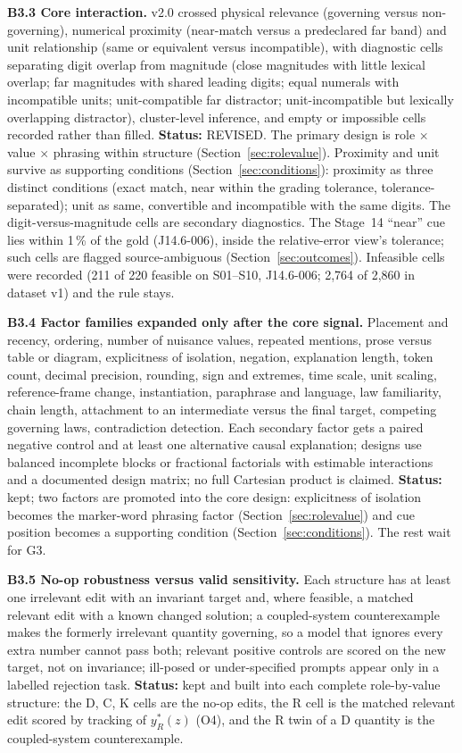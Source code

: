 \documentclass[10pt,a4paper]{article}
\begin{document}
\textbf{B3.3 Core interaction.} v2.0 crossed physical relevance (governing versus non-governing), numerical
proximity (near-match versus a predeclared far band) and unit relationship (same or equivalent versus
incompatible), with diagnostic cells separating digit overlap from magnitude (close magnitudes with little lexical
overlap; far magnitudes with shared leading digits; equal numerals with incompatible units; unit-compatible far
distractor; unit-incompatible but lexically overlapping distractor), cluster-level inference, and empty or
impossible cells recorded rather than filled. \textbf{Status:} REVISED. The primary design is role $\times$ value
$\times$ phrasing within structure (Section~\ref{sec:rolevalue}). Proximity and unit survive as supporting
conditions (Section~\ref{sec:conditions}): proximity as three distinct conditions (exact match, near within the
grading tolerance, tolerance-separated); unit as same, convertible and incompatible with the same digits. The
digit-versus-magnitude cells are secondary diagnostics. The Stage~14 ``near'' cue lies within 1\,\% of the gold
(J14.6-006), inside the relative-error view's tolerance; such cells are flagged source-ambiguous
(Section~\ref{sec:outcomes}). Infeasible cells were recorded (211 of 220 feasible on S01--S10, J14.6-006; 2,764
of 2,860 in dataset v1) and the rule stays.

\textbf{B3.4 Factor families expanded only after the core signal.} Placement and recency, ordering, number of
nuisance values, repeated mentions, prose versus table or diagram, explicitness of isolation, negation,
explanation length, token count, decimal precision, rounding, sign and extremes, time scale, unit scaling,
reference-frame change, instantiation, paraphrase and language, law familiarity, chain length, attachment to an
intermediate versus the final target, competing governing laws, contradiction detection. Each secondary factor
gets a paired negative control and at least one alternative causal explanation; designs use balanced incomplete
blocks or fractional factorials with estimable interactions and a documented design matrix; no full Cartesian
product is claimed. \textbf{Status:} kept; two factors are promoted into the core design: explicitness of
isolation becomes the marker-word phrasing factor (Section~\ref{sec:rolevalue}) and cue position becomes a
supporting condition (Section~\ref{sec:conditions}). The rest wait for G3.

\textbf{B3.5 No-op robustness versus valid sensitivity.} Each structure has at least one irrelevant edit with an
invariant target and, where feasible, a matched relevant edit with a known changed solution; a coupled-system
counterexample makes the formerly irrelevant quantity governing, so a model that ignores every extra number
cannot pass both; relevant positive controls are scored on the new target, not on invariance; ill-posed or
under-specified prompts appear only in a labelled rejection task. \textbf{Status:} kept and built into each
complete role-by-value structure: the D, C, K cells are the no-op edits, the R cell is the matched relevant edit
scored by tracking of $y^*_R(z)$ (O4), and the R twin of a D quantity is the coupled-system counterexample.
\end{document}
